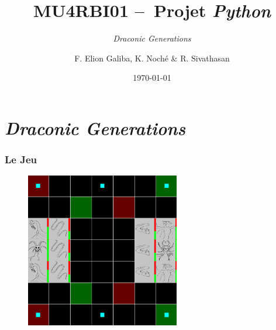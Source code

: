 \documentclass[12pt]{beamer}
\author{F. Elion Galiba, K. Noché \&{} R. Sivathasan}
\title{\textbf{MU4RBI01 --~Projet \emph{Python}}}
\subtitle{\emph{Draconic Generations}}
\institute{Sorbonne Université}
\date{\today}
\begin{document}
    \maketitle

    \section{\emph{Draconic Generations}} %
        \begin{frame} %
            \frametitle{Le Jeu}
            \begin{figure}[H]
                \centering
                \includegraphics[width=0.6\textwidth]{ImageDuJeu.png}
            \end{figure}
        \end{frame}
\end{document}
